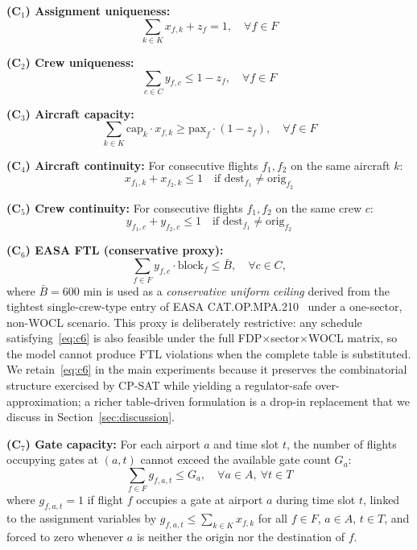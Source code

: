 \documentclass[12pt,number]{elsarticle}
\begin{document}
\textbf{(C$_1$) Assignment uniqueness:}
\begin{equation}
\sum_{k \in K} x_{f,k} + z_f = 1, \quad \forall f \in F
\label{eq:c1}
\end{equation}

\textbf{(C$_2$) Crew uniqueness:}
\begin{equation}
\sum_{c \in C} y_{f,c} \leq 1 - z_f, \quad \forall f \in F
\label{eq:c2}
\end{equation}

\textbf{(C$_3$) Aircraft capacity:}
\begin{equation}
\sum_{k \in K} \mathrm{cap}_k \cdot x_{f,k} \geq \mathrm{pax}_f \cdot (1 - z_f), \quad \forall f \in F
\label{eq:c3}
\end{equation}

\textbf{(C$_4$) Aircraft continuity:} For consecutive flights $f_1, f_2$ on the same aircraft $k$:
\begin{equation}
x_{f_1,k} + x_{f_2,k} \leq 1 \quad \text{if } \mathrm{dest}_{f_1} \neq \mathrm{orig}_{f_2}
\label{eq:c4}
\end{equation}

\textbf{(C$_5$) Crew continuity:} For consecutive flights $f_1, f_2$ on the same crew $c$:
\begin{equation}
y_{f_1,c} + y_{f_2,c} \leq 1 \quad \text{if } \mathrm{dest}_{f_1} \neq \mathrm{orig}_{f_2}
\label{eq:c5}
\end{equation}

\textbf{(C$_6$) EASA FTL (conservative proxy):}
\begin{equation}
\sum_{f \in F} y_{f,c} \cdot \mathrm{block}_f \leq \bar{B}, \quad \forall c \in C,
\label{eq:c6}
\end{equation}
\noindent where $\bar{B} = 600$ min is used as a \emph{conservative uniform ceiling} derived from the tightest single-crew-type entry of EASA CAT.OP.MPA.210~\cite{easa2022} under a one-sector, non-WOCL scenario. This proxy is deliberately restrictive: any schedule satisfying~\eqref{eq:c6} is also feasible under the full FDP$\times$sector$\times$WOCL matrix, so the model cannot produce FTL violations when the complete table is substituted. We retain~\eqref{eq:c6} in the main experiments because it preserves the combinatorial structure exercised by CP-SAT while yielding a regulator-safe over-approximation; a richer table-driven formulation is a drop-in replacement that we discuss in Section~\ref{sec:discussion}.

\textbf{(C$_7$) Gate capacity:} For each airport $a$ and time slot $t$, the number of flights occupying gates at $(a,t)$ cannot exceed the available gate count $G_a$:
\begin{equation}
\sum_{f \in F} g_{f,a,t} \leq G_a, \quad \forall a \in A,\ \forall t \in T
\label{eq:c7}
\end{equation}
where $g_{f,a,t} = 1$ if flight $f$ occupies a gate at airport $a$ during time slot $t$, linked to the assignment variables by $g_{f,a,t} \leq \sum_{k \in K} x_{f,k}$ for all $f \in F$, $a \in A$, $t \in T$, and forced to zero whenever $a$ is neither the origin nor the destination of $f$.
\end{document}
